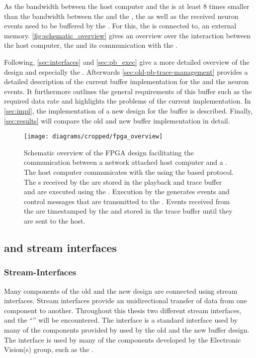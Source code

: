 As the bandwidth between the host computer and the \FPGA{} is at least $\num{8}$ times smaller than the bandwidth between the \FPGA{} and the \ASIC{}, the \PlaybackProgram{} as well as the received neuron events need to be buffered by the \FPGA{}. For this, the \FPGA{} is connected to, an external \DDRSIZE{} \DDR{} memory.
\autoref{fig:schematic_overview} gives an overview over the interaction between the host computer, the \FPGA{} and its communication with the \HICANNX{}.

Following, \autoref{sec:interfaces} and \autoref{sec:pb_exec} give a more detailed overview of the \FPGA{} design and especially the \pbexec{}. Afterwards \autoref{sec:old-pb-trace-management} provides a detailed description of the current buffer implementation for the \PlaybackProgram{} and the neuron events. It furthermore outlines the general requirements of this buffer such as the required data rate and highlights the problems of the current implementation. In \autoref{sec:impl}, the implementation of a new design for the buffer is described. Finally, \autoref{sec:results} will compare the old and new buffer implementation in detail.

\begin{figure}
\centerline{\texttt{[image: diagrams/cropped/fpga\_overview]}}
\caption{Schematic overview of the FPGA design facilitating the communication between a network attached host computer and a \HICANNX{}. The host computer communicates with the \FPGA{} using the \UDP{} based \HostARQ{} protocol. The \PlaybackProgram{}s received by the \FPGA{} are stored in the playback and trace buffer and are executed using the \pbexec{}. Execution by the \pbexec{} generates events and control messages that are transmitted to the \ASIC{}. Events received from the \ASIC{} are timestamped by the \pbexec{} and stored in the trace buffer until they are sent to the host.}\label{fig:schematic_overview}
\end{figure}


\subsection{\AXI{} and stream interfaces}\label{sec:interfaces}
\subsubsection{Stream-Interfaces}
Many components of the old and the new \FPGA{} design are connected using stream interfaces. Stream interfaces provide an unidirectional transfer of data from one component to another.
Throughout this thesis two different stream interfaces, \AXIStream{} and the ``\ValidNextStream{}'' will be encountered.
The \AXIStream{} interface is a standard interface used by many of the components provided by \Xilinx{} used by the old and the new buffer design. The \ValidNextStream{} interface is used by many of the components developed by the Electronic Vision(s) group, such as the \pbexec{}.

